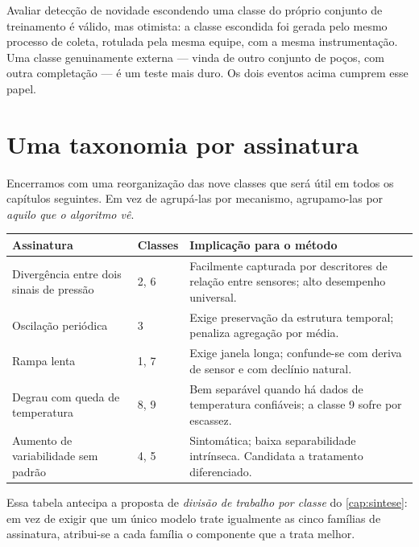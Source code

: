 \begin{destaque}
Avaliar detecção de novidade escondendo uma classe do próprio conjunto de treinamento é
válido, mas otimista: a classe escondida foi gerada pelo mesmo processo de coleta,
rotulada pela mesma equipe, com a mesma instrumentação. Uma classe genuinamente externa
--- vinda de outro conjunto de poços, com outra completação --- é um teste mais duro.
Os dois eventos acima cumprem esse papel.
\end{destaque}

\section{Uma taxonomia por assinatura}

Encerramos com uma reorganização das nove classes que será útil em todos os capítulos
seguintes. Em vez de agrupá-las por mecanismo, agrupamo-las por \emph{aquilo que o
algoritmo vê}.

\begin{center}
\small
\begin{tabular}{p{3.4cm} p{2.0cm} p{7.2cm}}
\toprule
\textbf{Assinatura} & \textbf{Classes} & \textbf{Implicação para o método} \\
\midrule
Divergência entre dois sinais de pressão & 2, 6 & Facilmente capturada por
descritores de relação entre sensores; alto desempenho universal. \\[0.3em]
Oscilação periódica & 3 & Exige preservação da estrutura temporal; penaliza
agregação por média. \\[0.3em]
Rampa lenta & 1, 7 & Exige janela longa; confunde-se com deriva de sensor e com
declínio natural. \\[0.3em]
Degrau com queda de temperatura & 8, 9 & Bem separável quando há dados de
temperatura confiáveis; a classe 9 sofre por escassez. \\[0.3em]
Aumento de variabilidade sem padrão & 4, 5 & Sintomática; baixa separabilidade
intrínseca. Candidata a tratamento diferenciado. \\
\bottomrule
\end{tabular}
\end{center}

Essa tabela antecipa a proposta de \emph{divisão de trabalho por classe} do
\cref{cap:sintese}: em vez de exigir que um único modelo trate igualmente as cinco
famílias de assinatura, atribui-se a cada família o componente que a trata melhor.

